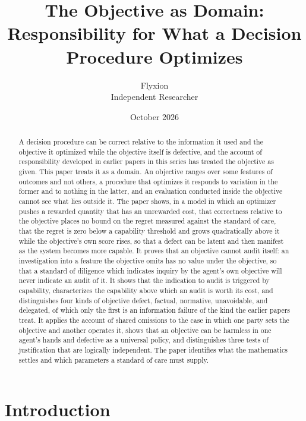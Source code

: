 \documentclass[11pt]{article}
\title{The Objective as Domain:\\Responsibility for What a Decision Procedure Optimizes}
\author{Flyxion\\Independent Researcher}
\date{October 2026}
\theoremstyle{plain}
\theoremstyle{definition}
\begin{document}
\maketitle

\begin{abstract}
\noindent A decision procedure can be correct relative to the information it used and the objective it optimized while the objective itself is defective, and the account of responsibility developed in earlier papers in this series has treated the objective as given. This paper treats it as a domain. An objective ranges over some features of outcomes and not others, a procedure that optimizes it responds to variation in the former and to nothing in the latter, and an evaluation conducted inside the objective cannot see what lies outside it. The paper shows, in a model in which an optimizer pushes a rewarded quantity that has an unrewarded cost, that correctness relative to the objective places no bound on the regret measured against the standard of care, that the regret is zero below a capability threshold and grows quadratically above it while the objective's own score rises, so that a defect can be latent and then manifest as the system becomes more capable. It proves that an objective cannot audit itself: an investigation into a feature the objective omits has no value under the objective, so that a standard of diligence which indicates inquiry by the agent's own objective will never indicate an audit of it. It shows that the indication to audit is triggered by capability, characterizes the capability above which an audit is worth its cost, and distinguishes four kinds of objective defect, factual, normative, unavoidable, and delegated, of which only the first is an information failure of the kind the earlier papers treat. It applies the account of shared omissions to the case in which one party sets the objective and another operates it, shows that an objective can be harmless in one agent's hands and defective as a universal policy, and distinguishes three tests of justification that are logically independent. The paper identifies what the mathematics settles and which parameters a standard of care must supply.
\end{abstract}

\section{Introduction}\label{sec:intro}
\end{document}
